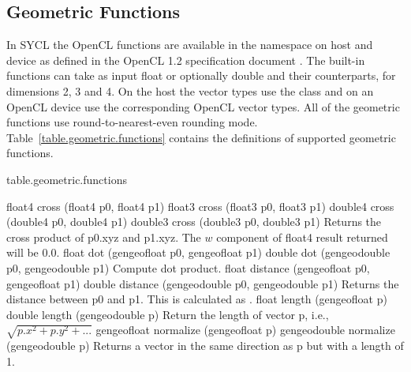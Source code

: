 \subsection{Geometric Functions}

In SYCL the OpenCL  functions are available in the
namespace  on host and device as defined in the
OpenCL 1.2 specification document \cite[par. 6.12.5]{opencl12}. The
built-in functions can take as input float or optionally double and
their  counterparts, for dimensions 2, 3 and 4. On the
host the vector types use the  class and on an OpenCL
device use the corresponding OpenCL vector types. All of the geometric
functions use round-to-nearest-even rounding
mode. Table~\ref{table.geometric.functions} contains the definitions
of supported geometric functions.

 
{table.geometric.functions}

\addRowFourSL
{float4 cross (float4 p0, float4 p1)}
{float3 cross (float3 p0, float3 p1)}
{double4 cross (double4 p0, double4 p1)}
{double3 cross (double3 p0, double3 p1)}
{
Returns the cross product of p0.xyz and p1.xyz. The
$w$ component of float4 result returned will be 0.0.
}
\addRowTwoSL
{ float dot (gengeofloat p0, gengeofloat p1)}
{ double dot (gengeodouble p0, gengeodouble p1) }
{
Compute dot product.
}
\addRowTwoSL
{float distance (gengeofloat p0, gengeofloat p1)}
{double distance (gengeodouble p0, gengeodouble p1)}
{
Returns the distance between p0 and p1. This is
calculated as .
}
\addRowTwoSL
{float length (gengeofloat p)}
{double length (gengeodouble p)}
{
Return the length of vector p, i.e.,
$\sqrt{ p.x^2 + p.y^2 + ...}$
}
\addRowTwoSL
{gengeofloat normalize (gengeofloat p)}
{gengeodouble normalize (gengeodouble p)}
{
Returns a vector in the same direction as p but with a
length of 1.
}

